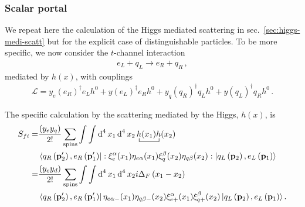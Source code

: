 \subsubsection{Scalar portal}


We repeat here the calculation of the Higgs mediated scattering in sec.~\ref{sec:higgs-medi-scatt} but for the explicit case of distinguishable particles. To be more specific, 
we now consider the $t$-channel interaction
\begin{align}
  e_L+q_L \to e_R+q_R\,,
\end{align}
mediated by $h(x)$, with couplings
\begin{align}
\label{eq:xietaz}
\mathcal{L}= y_e \left(e_R\right)^{\dagger} e_L h^0 +y \left(e_L\right)^{\dagger} e_R h^0 
+y_q \left(q_R\right)^{\dagger} q_L h^0 +y \left(q_L\right)^{\dagger} q_R h^0 \,.
\end{align}


The specific calculation by the scattering mediated by the Higgs, $h(x)$, is 
\begin{align}
  S_{fi}=&\frac{\left(y_ey_q \right)}{2!}\sum_{\text{spins}}\int\int \operatorname{d}^4x_1 \operatorname{d}^4x_2
\bcontraction{\,}{h}{(x_1)}{h}\,h(x_1)h(x_2) \nonumber\\
&\left\langle q_R \left(\mathbf{p}'_2\right),e_R\left(\mathbf{p}'_1\right) \right|
  : \xi^{\alpha}_{e}(x_1)\eta_{e\alpha}(x_1)
    \xi^{\beta}_{q}(x_2)\eta_{q\beta}(x_2):
 \left| q_L\left(\mathbf{p}_2\right) ,e_L \left(\mathbf{p}_1\right)  \right\rangle \nonumber\\
=&\frac{\left( y_ey_d \right)}{2!}\sum_{\text{spins}}\int\int \operatorname{d}^4x_1 \operatorname{d}^4x_2
i\Delta_F \left( x_1-x_2 \right)\nonumber\\
&\left\langle q_R \left(\mathbf{p}'_2\right),e_R\left(\mathbf{p}'_1\right)\right|
   \eta_{e\alpha-}(x_1)\eta_{q\beta-}(x_2) \xi^{\alpha}_{e+}(x_1)\xi^{\beta}_{q+}(x_2)
 \left| q_L\left(\mathbf{p}_2\right), e_L \left(\mathbf{p}_1\right)\right\rangle. 
\end{align}



